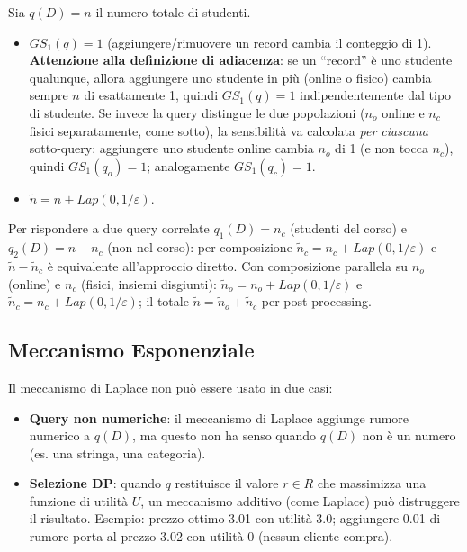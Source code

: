 \documentclass[a4paper,11pt]{article}
\begin{document}
\begin{esempio}
Sia $q(D) = n$ il numero totale di studenti.
\begin{itemize}
  \item $GS_1(q) = 1$ (aggiungere/rimuovere un record cambia il conteggio di 1). \textbf{Attenzione alla definizione di adiacenza}: se un ``record'' \`{e} uno studente qualunque, allora aggiungere uno studente in pi\`{u} (online o fisico) cambia sempre $n$ di esattamente 1, quindi $GS_1(q)=1$ indipendentemente dal tipo di studente. Se invece la query distingue le due popolazioni ($n_o$ online e $n_c$ fisici separatamente, come sotto), la sensibilit\`{a} va calcolata \emph{per ciascuna} sotto-query: aggiungere uno studente online cambia $n_o$ di 1 (e non tocca $n_c$), quindi $GS_1(q_o)=1$; analogamente $GS_1(q_c)=1$.
  \item $\tilde{n} = n + Lap(0, 1/\varepsilon)$.
\end{itemize}
Per rispondere a due query correlate $q_1(D) = n_c$ (studenti del corso) e $q_2(D) = n - n_c$ (non nel corso): per composizione $\tilde{n}_c = n_c + Lap(0, 1/\varepsilon)$ e $\tilde{n} - \tilde{n}_c$ \`{e} equivalente all'approccio diretto. Con composizione parallela su $n_o$ (online) e $n_c$ (fisici, insiemi disgiunti): $\tilde{n}_o = n_o + Lap(0, 1/\varepsilon)$ e $\tilde{n}_c = n_c + Lap(0, 1/\varepsilon)$; il totale $\tilde{n} = \tilde{n}_o + \tilde{n}_c$ per post-processing.
\end{esempio}

\subsection{Meccanismo Esponenziale}

Il meccanismo di Laplace non pu\`{o} essere usato in due casi:
\begin{itemize}
  \item \textbf{Query non numeriche}: il meccanismo di Laplace aggiunge rumore numerico a $q(D)$, ma questo non ha senso quando $q(D)$ non \`{e} un numero (es. una stringa, una categoria).
  \item \textbf{Selezione DP}: quando $q$ restituisce il valore $r \in R$ che massimizza una funzione di utilit\`{a} $U$, un meccanismo additivo (come Laplace) pu\`{o} distruggere il risultato. Esempio: prezzo ottimo 3.01 con utilit\`{a} 3.0; aggiungere 0.01 di rumore porta al prezzo 3.02 con utilit\`{a} 0 (nessun cliente compra).
\end{itemize}
\end{document}
